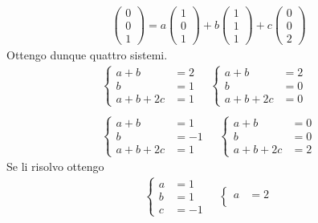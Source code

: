 \begin{example}
\begin{gather*}
		\\
		\begin{pmatrix}
			0 \\ 0 \\ 1
		\end{pmatrix} =
		a \begin{pmatrix}
			1 \\ 0 \\ 1
		\end{pmatrix} +
		b \begin{pmatrix}
			1 \\ 1 \\ 1
		\end{pmatrix} +
		c \begin{pmatrix}
			0 \\ 0 \\ 2
		\end{pmatrix}
	\end{gather*}
	Ottengo dunque quattro sistemi.
	\begin{gather*}
		\begin{cases}
			a + b      & = 2 \\
			b          & = 1 \\
			a + b + 2c & = 1
		\end{cases}
		\quad
		\begin{cases}
			a + b      & = 2 \\
			b          & = 0 \\
			a + b + 2c & = 0
		\end{cases} \\
		\\
		\begin{cases}
			a + b      & = 1  \\
			b          & = -1 \\
			a + b + 2c & = 1
		\end{cases}
		\quad
		\begin{cases}
			a + b      & = 0 \\
			b          & = 0 \\
			a + b + 2c & = 2
		\end{cases}
	\end{gather*}
	Se li risolvo ottengo
	\begin{gather*}
		\begin{cases}
			a & = 1  \\
			b & = 1  \\
			c & = -1
		\end{cases}
		\quad
		\begin{cases}
			a & = 2  \\

\end{cases}
\end{gather*}
\end{example}
